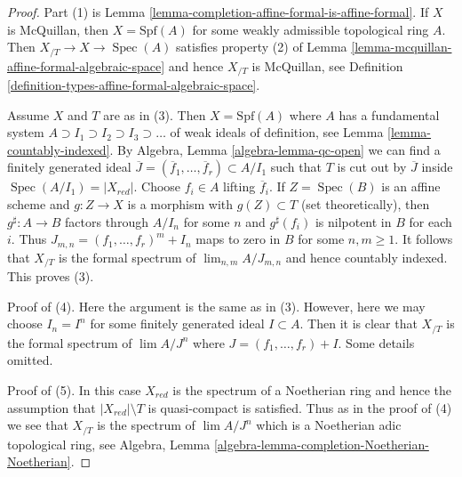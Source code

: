 \documentclass{stacks-project}
\theoremstyle{plain}
\theoremstyle{definition}
\theoremstyle{remark}
\numberwithin{equation}{subsection}
\def\lim{\mathop{\mathrm{lim}}\nolimits}
\def\Spec{\mathop{\mathrm{Spec}}}
\begin{document}
\begin{proof}
Part (1) is Lemma \ref{lemma-completion-affine-formal-is-affine-formal}.
If $X$ is McQuillan, then $X = \text{Spf}(A)$ for some weakly admissible
topological ring $A$. Then $X_{/T} \to X \to \Spec(A)$ satisfies
property (2) of Lemma \ref{lemma-mcquillan-affine-formal-algebraic-space}
and hence $X_{/T}$ is McQuillan, see
Definition \ref{definition-types-affine-formal-algebraic-space}.

\medskip\noindent
Assume $X$ and $T$ are as in (3).
Then $X = \text{Spf}(A)$ where $A$ has a fundamental system
$A \supset I_1 \supset I_2 \supset I_3 \supset \ldots$
of weak ideals of definition, see Lemma \ref{lemma-countably-indexed}.
By Algebra, Lemma \ref{algebra-lemma-qc-open}
we can find a finitely generated ideal
$\overline{J} = (\overline{f}_1, \ldots, \overline{f}_r) \subset A/I_1$
such that $T$ is cut out by $\overline{J}$ inside $\Spec(A/I_1) = |X_{red}|$.
Choose $f_i \in A$ lifting $\overline{f}_i$.
If $Z = \Spec(B)$ is an affine scheme and $g : Z \to X$ is
a morphism with $g(Z) \subset T$ (set theoretically), then
$g^\sharp : A \to B$ factors through $A/I_n$ for some $n$
and $g^\sharp(f_i)$ is nilpotent in $B$ for each $i$. Thus
$J_{m, n} = (f_1, \ldots, f_r)^m + I_n$ maps to zero in $B$
for some $n, m \geq 1$. It follows that $X_{/T}$ is the formal spectrum of
$\lim_{n, m} A/J_{m, n}$ and hence countably indexed.
This proves (3).

\medskip\noindent
Proof of (4). Here the argument is the same as in (3).
However, here we may choose $I_n = I^n$ for some finitely generated ideal
$I \subset A$. Then it is clear that $X_{/T}$ is the formal spectrum of
$\lim A/J^n$ where $J = (f_1, \ldots, f_r) + I$. Some details omitted.

\medskip\noindent
Proof of (5). In this case $X_{red}$ is the spectrum of a Noetherian ring
and hence the assumption that $|X_{red}| \setminus T$ is quasi-compact
is satisfied. Thus as in the proof of (4) we see that
$X_{/T}$ is the spectrum of $\lim A/J^n$ which is a Noetherian
adic topological ring, see
Algebra, Lemma \ref{algebra-lemma-completion-Noetherian-Noetherian}.
\end{proof}
\end{document}
